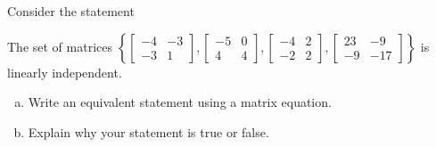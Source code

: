 
\begin{exerciseStatement}


Consider the statement 
\begin{center}\begin{minipage}{0.8\textwidth}
 The set of matrices \( \left\{ \left[\begin{array}{cc}
-4 & -3 \\
-3 & 1
\end{array}\right] , \left[\begin{array}{cc}
-5 & 0 \\
4 & 4
\end{array}\right] , \left[\begin{array}{cc}
-4 & 2 \\
-2 & 2
\end{array}\right] , \left[\begin{array}{cc}
23 & -9 \\
-9 & -17
\end{array}\right] \right\} \) is linearly independent.
\end{minipage}\end{center}
    


\begin{enumerate}[(a)]
\item  Write an equivalent statement using a matrix equation.
\item  Explain why your statement is true or false.
\end{enumerate}
    
\end{exerciseStatement}
    
